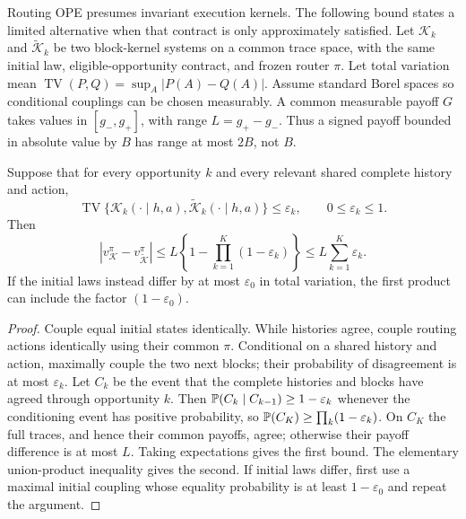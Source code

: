 Routing OPE presumes invariant execution kernels. The following bound states a limited alternative when that contract is only approximately satisfied. Let $\mathcal K_k$ and $\widetilde{\mathcal K}_k$ be two block-kernel systems on a common trace space, with the same initial law, eligible-opportunity contract, and frozen router $\pi$. Let total variation mean $\operatorname{TV}(P,Q)=\sup_A|P(A)-Q(A)|$. Assume standard Borel spaces so conditional couplings can be chosen measurably. A common measurable payoff $G$ takes values in $[g_-,g_+]$, with range $L=g_+-g_-$. Thus a signed payoff bounded in absolute value by $B$ has range at most $2B$, not $B$.

\begin{theorem}
\label{thm:kernel-drift}
Suppose that for every opportunity $k$ and every relevant shared complete history and action,
\begin{equation}
 \operatorname{TV}\{\mathcal K_k(\cdot\mid h,a),
                   \widetilde{\mathcal K}_k(\cdot\mid h,a)\}
 \le\varepsilon_k,\qquad 0\le\varepsilon_k\le1.
 \label{eq:kernel-tv}
\end{equation}
Then
\begin{equation}
 |v_{\mathcal K}^{\pi}-v_{\widetilde{\mathcal K}}^{\pi}|
 \le L\left\{1-\prod_{k=1}^{K}(1-\varepsilon_k)\right\}
 \le L\sum_{k=1}^{K}\varepsilon_k.
 \label{eq:kernel-bound}
\end{equation}
If the initial laws instead differ by at most $\varepsilon_0$ in total variation, the first product can include the factor $(1-\varepsilon_0)$.
\end{theorem}

\begin{proof}
Couple equal initial states identically. While histories agree, couple routing actions identically using their common $\pi$. Conditional on a shared history and action, maximally couple the two next blocks; their probability of disagreement is at most $\varepsilon_k$. Let $C_k$ be the event that the complete histories and blocks have agreed through opportunity $k$. Then $\P(C_k\mid C_{k-1})\ge1-\varepsilon_k$ whenever the conditioning event has positive probability, so $\P(C_K)\ge\prod_k(1-\varepsilon_k)$. On $C_K$ the full traces, and hence their common payoffs, agree; otherwise their payoff difference is at most $L$. Taking expectations gives the first bound. The elementary union-product inequality gives the second. If initial laws differ, first use a maximal initial coupling whose equality probability is at least $1-\varepsilon_0$ and repeat the argument.
\end{proof}

